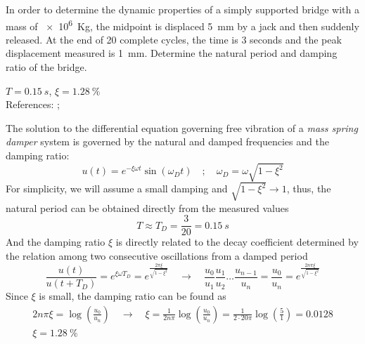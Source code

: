
\begin{Exercise}[label={free_vibration}]
In order to determine the dynamic properties of a simply supported bridge with a mass of \qty{e6}{Kg}, the midpoint is displaced \qty{5}{mm} by a jack and then suddenly released. At the end of 20 complete cycles, the time is 3 seconds and the peak displacement measured is \qty{1}{mm}. Determine the natural period and damping ratio of the bridge.

\begin{center}
\end{center}

\shortAnswer $T=\SI{0.15}{s}$, $\xi=\SI{1.28}{\%}$ \\
References: \cite[page 49]{chopra}; \cite[page 287]{blanco}
\end{Exercise}



\begin{Answer}[ref={free_vibration}]
The solution to the differential equation governing free vibration of a \emph{mass spring damper} system is governed by the natural and damped frequencies and the damping ratio:
$$
u(t) = e^{-\xi\omega t}\sin(\omega_D t) \quad ; \quad \omega_D = \omega\sqrt{1-\xi^2}
$$
For simplicity, we will assume a small damping and $\sqrt{1-\xi^2}\rightarrow1$, thus, the natural period can be obtained directly from the measured values
$$
T \approx T_D = \frac{3}{20} = \SI{0.15}{s}
$$
And the damping ratio $\xi$ is directly related to the decay coefficient determined by the relation among two consecutive oscillations from a damped period
$$
\frac{u(t)}{u(t+T_D)} = e^{\xi\omega T_D} = e^{\frac{2\pi\xi}{\sqrt{1-\xi^2}}} \quad \rightarrow \quad
\frac{u_0}{u_1} \frac{u_1}{u_2} \dots \frac{u_{n-1}}{u_n} = \frac{u_0}{u_n} = e^{\frac{2n\pi\xi}{\sqrt{1-\xi^2}}}
$$
Since $\xi$ is small, the damping ratio can be found as
\begin{align*}
2n\pi\xi = \log\left(\frac{u_0}{u_n}\right) \quad \rightarrow \quad
\xi = \frac{1}{2n\pi} \log\left(\frac{u_0}{u_n}\right) = \frac{1}{2\cdot20\pi} \log\left(\frac{5}{1}\right) = 0.0128 \\
\xi = \SI{1.28}{\%}
\end{align*}    

\end{Answer}
